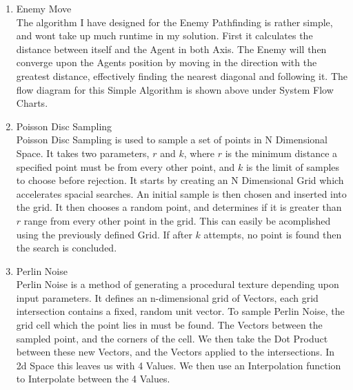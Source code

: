 \begin{flushleft}
\begin{enumerate}
\begin{enumerate}[label=\arabic*)]
                \vspace{0.5cm}
                \item Enemy Move \\
                The algorithm I have designed for the Enemy Pathfinding is rather simple, and wont take up much runtime in my solution.
                First it calculates the distance between itself and the Agent in both Axis. The Enemy will then converge upon the Agents
                position by moving in the direction with the greatest distance, effectively finding the nearest diagonal and following it.
                The flow diagram for this Simple Algorithm is shown above under System Flow Charts.
                
                \vspace{0.5cm}
                \item Poisson Disc Sampling \\
                Poisson Disc Sampling is used to sample a set of points in N Dimensional Space. It takes two parameters, $r$ and $k$, where
                $r$ is the minimum distance a specified point must be from every other point, and $k$ is the limit of samples to choose
                before rejection. It starts by creating an N Dimensional Grid which accelerates spacial searches. An initial sample is then
                chosen and inserted into the grid. It then chooses a random point, and determines if it is greater than $r$ range from every 
                other point in the grid. This can easily be acomplished using the previously defined Grid. If after $k$ attempts, no point is
                found then the search is concluded.
                
                \vspace{0.5cm}
                \item Perlin Noise \\
                Perlin Noise is a method of generating a procedural texture depending upon input parameters. It defines an n-dimensional
                grid of Vectors, each grid intersection contains a fixed, random unit vector. To sample Perlin Noise, the grid cell which
                the point lies in must be found. The Vectors between the sampled point, and the corners of the cell. We then take the Dot
                Product between these new Vectors, and the Vectors applied to the intersections. In 2d Space this leaves us with 4 Values.
                We then use an Interpolation function to Interpolate between the 4 Values. 
                

\end{enumerate}
\end{enumerate}
\end{flushleft}
